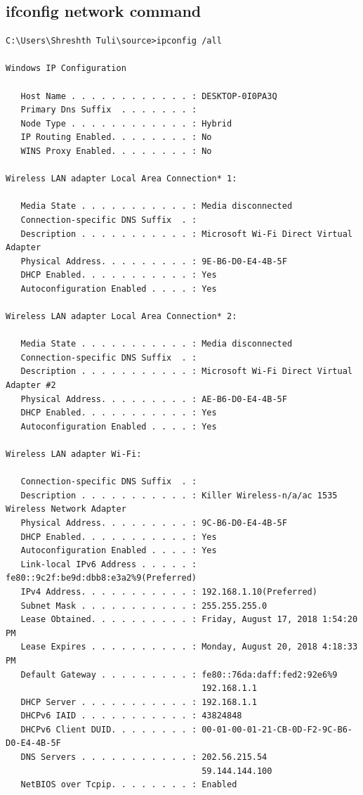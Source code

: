 \documentclass[a4paper, 11pt]{article}
\begin{document}
\begin{appendices}
\subsection{ifconfig network command}
\label{appendix:ifconfig}

\begin{lstlisting}[style=BashInputStyle]
C:\Users\Shreshth Tuli\source>ipconfig /all

Windows IP Configuration

   Host Name . . . . . . . . . . . . : DESKTOP-0I0PA3Q
   Primary Dns Suffix  . . . . . . . :
   Node Type . . . . . . . . . . . . : Hybrid
   IP Routing Enabled. . . . . . . . : No
   WINS Proxy Enabled. . . . . . . . : No

Wireless LAN adapter Local Area Connection* 1:

   Media State . . . . . . . . . . . : Media disconnected
   Connection-specific DNS Suffix  . :
   Description . . . . . . . . . . . : Microsoft Wi-Fi Direct Virtual Adapter
   Physical Address. . . . . . . . . : 9E-B6-D0-E4-4B-5F
   DHCP Enabled. . . . . . . . . . . : Yes
   Autoconfiguration Enabled . . . . : Yes

Wireless LAN adapter Local Area Connection* 2:

   Media State . . . . . . . . . . . : Media disconnected
   Connection-specific DNS Suffix  . :
   Description . . . . . . . . . . . : Microsoft Wi-Fi Direct Virtual Adapter #2
   Physical Address. . . . . . . . . : AE-B6-D0-E4-4B-5F
   DHCP Enabled. . . . . . . . . . . : Yes
   Autoconfiguration Enabled . . . . : Yes

Wireless LAN adapter Wi-Fi:

   Connection-specific DNS Suffix  . :
   Description . . . . . . . . . . . : Killer Wireless-n/a/ac 1535 Wireless Network Adapter
   Physical Address. . . . . . . . . : 9C-B6-D0-E4-4B-5F
   DHCP Enabled. . . . . . . . . . . : Yes
   Autoconfiguration Enabled . . . . : Yes
   Link-local IPv6 Address . . . . . : fe80::9c2f:be9d:dbb8:e3a2%9(Preferred)
   IPv4 Address. . . . . . . . . . . : 192.168.1.10(Preferred)
   Subnet Mask . . . . . . . . . . . : 255.255.255.0
   Lease Obtained. . . . . . . . . . : Friday, August 17, 2018 1:54:20 PM
   Lease Expires . . . . . . . . . . : Monday, August 20, 2018 4:18:33 PM
   Default Gateway . . . . . . . . . : fe80::76da:daff:fed2:92e6%9
                                       192.168.1.1
   DHCP Server . . . . . . . . . . . : 192.168.1.1
   DHCPv6 IAID . . . . . . . . . . . : 43824848
   DHCPv6 Client DUID. . . . . . . . : 00-01-00-01-21-CB-0D-F2-9C-B6-D0-E4-4B-5F
   DNS Servers . . . . . . . . . . . : 202.56.215.54
                                       59.144.144.100
   NetBIOS over Tcpip. . . . . . . . : Enabled
\end{lstlisting}


\end{appendices}
\end{document}
